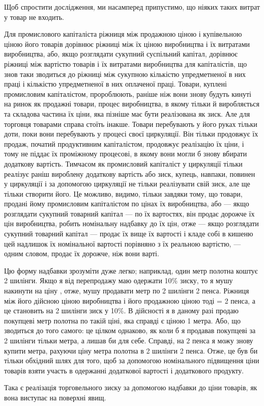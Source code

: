 \parcont{}  %
Щоб спростити дослідження, ми насамперед припустимо, що
ніяких таких витрат у товар не входить.

Для промислового капіталіста ріжниця між продажною ціною
і купівельною ціною його товарів дорівнює ріжниці між їх ціною
виробництва і їх витратами виробництва, або, якщо розглядати
сукупний суспільний капітал, дорівнює ріжниці між
вартістю товарів і їх витратами виробництва для капіталістів,
що знов таки зводиться до ріжниці між сукупною кількістю
упредметненої в них праці і кількістю упредметненої в них
оплаченої праці. Товари, куплені промисловим капіталістом, пророблюють,
раніше ніж вони знову будуть кинуті на ринок як
продажні товари, процес виробництва, в якому тільки й виробляється
та складова частина їх ціни, яка пізніше має бути
реалізована як зиск. Але для торговця товарами справа стоїть
інакше. Товари перебувають у його руках тільки доти, поки
вони перебувають у процесі своєї циркуляції. Він тільки продовжує
їх продаж, початий продуктивним капіталістом, продовжує
реалізацію їх ціни, і тому не піддає їх проміжному процесові,
в якому вони могли б знову вбирати додаткову вартість. Тимчасом
як промисловий капіталіст у циркуляції тільки реалізує
раніш вироблену додаткову вартість або зиск, купець, навпаки,
повинен у циркуляції і за допомогою циркуляції не тільки реалізувати
свій зиск, але ще тільки створити його. Це можливо,
видимо, тільки завдяки тому, що товари, продані йому промисловим
капіталістом по цінах їх виробництва, або — якщо розглядати
сукупний товарний капітал — по їх вартостях, він продає
дорожче їх цін виробництва, робить номінальну надбавку до
їх цін, отже — якщо розглядати сукупний товарний капітал —
продає їх вище їх вартості і кладе собі в кишеню цей надлишок
їх номінальної вартості порівняно з їх реальною вартістю, — одним
словом, продає їх дорожче, ніж вони варті.

Цю форму надбавки зрозуміти дуже легко; наприклад, один
метр полотна коштує 2 шилінги. Якщо я від перепродажу маю
одержати 10\% зиску, то я мушу накинути на ціну , отже,
мушу продавати метр по 2 шилінги 2 пенса. Ріжниця між його
дійсною ціною виробництва і його продажною ціною тоді = 2
пенса, а це становить на 2 шилінги зиск у 10\%. В дійсності
я в даному разі продаю покупцеві метр полотна по такій ціні,
яка справді є ціною 1 метра. Або, що зводиться до того
самого: це цілком однаково, як коли б я продавав покупцеві за
2 шилінги тільки  метра, а  лишав би для себе. Справді, на
2 пенса я можу знову купити  метра, рахуючи ціну метра
полотна в 2 шилінги 2 пенса. Отже, це був би тільки обхідний
шлях для того, щоб за допомогою номінального підвищення
ціни товарів взяти участь в одержанні додаткової вартості і додаткового
продукту.

Така є реалізація торговельного зиску за допомогою надбавки
до ціни товарів, як вона виступає на поверхні явищ.
\parbreak{}  %
